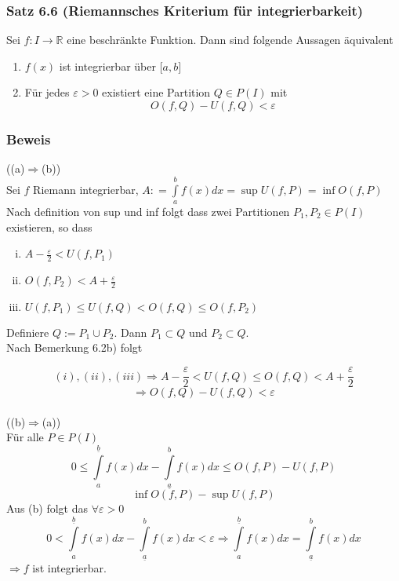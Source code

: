 \subsubsection*{Satz 6.6 (Riemannsches Kriterium für integrierbarkeit)}
Sei $f:I\rightarrow\mathbb{R}$ eine beschränkte Funktion. Dann sind folgende Aussagen äquivalent
\begin{enumerate}
\item $f(x)$ ist integrierbar über $\lbrack a,b\rbrack$
\item Für jedes $\varepsilon>0$ existiert eine Partition $Q\in P(I)$ mit $$O(f,Q)-U(f,Q)<\varepsilon$$
\end{enumerate}
\subsubsection*{Beweis}
((a)$\Rightarrow$(b))\\
Sei $f$ Riemann integrierbar, $A: = \int\limits_a^b {f(x)dx = \sup U(f,P) = \inf O(f,P)}$\\
Nach definition von sup und inf folgt dass zwei Partitionen $P_1,P_2\in P(I)$ existieren, so dass 

\begin{enumerate}[(i)]
\item $A-\frac{\varepsilon}{2}<U(f,P_1)$
\item $O(f,P_2)<A+\frac{\varepsilon}{2}$
\item $U(f,P_1) \leq U(f,Q) < O(f,Q) \leq O(f,P_2)$ 
\end{enumerate} 




Definiere $Q:=P_1\cup P_2$. Dann $P_1\subset Q$ und $P_2 \subset Q$.\\
Nach Bemerkung 6.2b) folgt

$$(i),(ii),(iii) \Rightarrow A-\frac{\varepsilon}{2}<U(f,Q)\leq O(f,Q)<A+\frac{\varepsilon}{2}$$
$$\Rightarrow O(f,Q)-U(f,Q) < \varepsilon$$\\

\noindent((b)$\Rightarrow$(a))\\
Für alle $P\in P(I)$ $$0 \le \int\limits_a^{\underline{b}} {f(x)dx - \int\limits_{\underline{a}}^b {f(x)dx \le O(f,P) - U(f,P)} } $$ $$\inf O(f,P) - \sup U(f,P)$$
Aus (b) folgt das $\forall\varepsilon>0$ $$0 < \int\limits_a^{\underline{b}} {f(x)dx - \int\limits_{\underline{a}}^b {f(x)dx < \varepsilon } } \Rightarrow \int\limits_a^{\underline{b}} {f(x)dx = \int\limits_{\underline{a}}^b {f(x)dx} } $$ $\Rightarrow f$ ist integrierbar.

